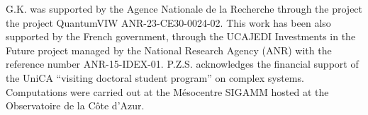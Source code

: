 \documentclass[%
 reprint,
 amsmath,amssymb,
 aps,
 prl,
]{revtex4-2}
\begin{document}
{\begin{acknowledgments}
    G.K. was supported by the Agence Nationale de la Recherche through the project the project QuantumVIW ANR-23-CE30-0024-02.
    This work has been also supported by the French government, through the UCAJEDI Investments in the Future project managed by the National Research Agency (ANR) with the reference number ANR-15-IDEX-01. P.Z.S. acknowledges the financial support of the UniCA ``visiting doctoral student program'' on complex systems. Computations were carried out at the Mésocentre SIGAMM hosted at the Observatoire de la Côte d’Azur.

  \end{acknowledgments}



}
\end{document}
